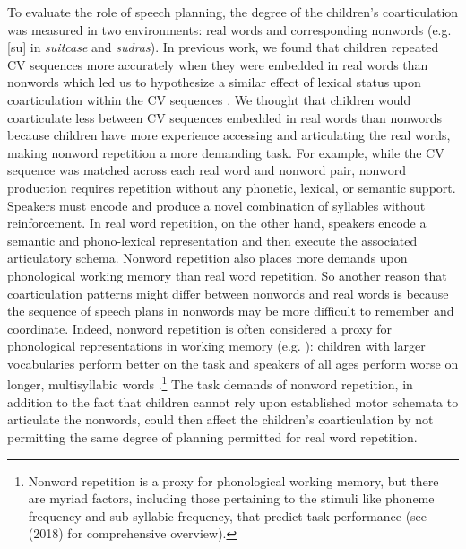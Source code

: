\documentclass[a4paper,man,natbib,donotrepeattitle, apacite]{apa6}
\begin{document}
To evaluate the role of speech planning, the degree of the children’s coarticulation was measured in two environments: real words and corresponding nonwords (e.g. [su] in \textit{suitcase} and \textit{sudras}). In previous work, we found that children repeated CV sequences more accurately when they were embedded in real words than nonwords which led us to hypothesize a similar effect of lexical status upon coarticulation within the CV sequences \cite{cychoszLexicalAdvantageFouryearold2020}. We thought that children would coarticulate less between CV sequences embedded in real words than nonwords because children have more experience accessing and articulating the real words, making nonword repetition a more demanding task. For example, while the CV sequence was matched across each real word and nonword pair, nonword production requires repetition without any phonetic, lexical, or semantic support. Speakers must encode and produce a novel combination of syllables without reinforcement. In real word repetition, on the other hand, speakers encode a semantic and phono-lexical representation and then execute the associated articulatory schema. Nonword repetition also places more demands upon phonological working memory than real word repetition. So another reason that coarticulation patterns might differ between nonwords and real words is because the sequence of speech plans in nonwords may be more difficult to remember and coordinate. Indeed, nonword repetition is often considered a proxy for phonological representations in working memory (e.g. ): children with larger vocabularies perform better on the task \cite{edwardsInteractionVocabularySize2004,munsonRelationshipsNonwordRepetition2005} and speakers of all ages perform worse on longer, multisyllabic words \cite{byrdNonwordRepetitionPhoneme2012}.\footnote{Nonword repetition is a proxy for phonological working memory, but there are myriad factors, including those pertaining to the stimuli like phoneme frequency and sub-syllabic frequency, that predict task performance (see \citeauthor{szewczykNonwordRepetitionDepends2018} (2018) for comprehensive overview).} The task demands of nonword repetition, in addition to the fact that children cannot rely upon established motor schemata to articulate the nonwords, could then affect the children’s coarticulation by not permitting the same degree of planning permitted for real word repetition. 
\end{document}
